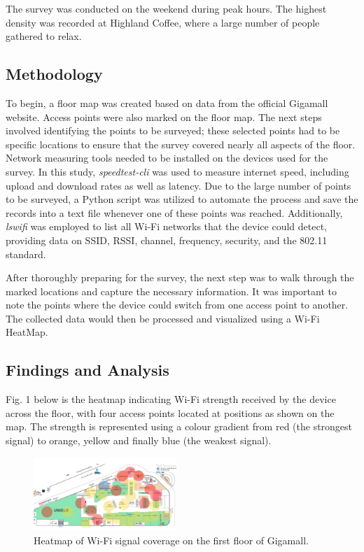 \documentclass[conference]{IEEEtran}
\begin{document}
The survey was conducted on the weekend during peak hours. The highest density was recorded at Highland Coffee, where a large number of people gathered to relax.

\subsection{Methodology}
To begin, a floor map was created based on data from the official Gigamall website. Access points were also marked on the floor map. The next steps involved identifying the points to be surveyed; these selected points had to be specific locations to ensure that the survey covered nearly all aspects of the floor. Network measuring tools needed to be installed on the devices used for the survey. In this study, \textit{speedtest-cli} was used to measure internet speed, including upload and download rates as well as latency. Due to the large number of points to be surveyed, a Python script was utilized to automate the process and save the records into a text file whenever one of these points was reached. Additionally, \textit{lswifi} was employed to list all Wi-Fi networks that the device could detect, providing data on SSID, RSSI, channel, frequency, security, and the 802.11 standard.

After thoroughly preparing for the survey, the next step was to walk through the marked locations and capture the necessary information. It was important to note the points where the device could switch from one access point to another. The collected data would then be processed and visualized using a Wi-Fi HeatMap.

\subsection{Findings and Analysis}

Fig. 1 below is the heatmap indicating Wi-Fi strength received by the device across the floor, with four access points located at positions as shown on the map. The strength is represented using a colour gradient from red (the strongest signal) to orange, yellow and finally blue (the weakest signal).

\begin{figure}[htbp]
    \centering
    \includegraphics[width=0.48\textwidth]{heatmap.png}
    \caption{Heatmap of Wi-Fi signal coverage on the first floor of Gigamall.}
\end{figure}
\end{document}
